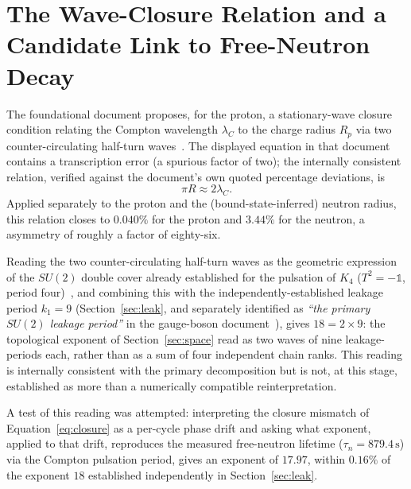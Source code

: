 \documentclass[11pt,a4paper]{article}
\newcommand{\Kfour}{K_4}
\newcommand{\lamC}{\lambda_C}
\begin{document}
\section{The Wave-Closure Relation and a Candidate Link to Free-Neutron Decay}
\label{sec:wave}

The foundational document proposes, for the proton, a stationary-wave closure condition relating the Compton wavelength $\lamC$ to the charge radius $R_p$ via two counter-circulating half-turn waves~\citep{D01}. The displayed equation in that document contains a transcription error (a spurious factor of two); the internally consistent relation, verified against the document's own quoted percentage deviations, is
\begin{equation}
\pi R \approx 2\lamC.
\label{eq:closure}
\end{equation}
Applied separately to the proton and the (bound-state-inferred) neutron radius, this relation closes to $0.040\%$ for the proton and $3.44\%$ for the neutron, a asymmetry of roughly a factor of eighty-six.

\begin{explorbox}
Reading the two counter-circulating half-turn waves as the geometric expression of the $SU(2)$ double cover already established for the pulsation of $\Kfour$ ($T^2=-\mathbb{1}$, period four)~\citep{D33}, and combining this with the independently-established leakage period $k_1=9$ (Section~\ref{sec:leak}, and separately identified as \emph{``the primary $SU(2)$ leakage period''} in the gauge-boson document~\citep{D62}), gives $18=2\times9$: the topological exponent of Section~\ref{sec:space} read as two waves of nine leakage-periods each, rather than as a sum of four independent chain ranks. This reading is internally consistent with the primary decomposition but is not, at this stage, established as more than a numerically compatible reinterpretation.
\end{explorbox}

A test of this reading was attempted: interpreting the closure mismatch of Equation~\eqref{eq:closure} as a per-cycle phase drift and asking what exponent, applied to that drift, reproduces the measured free-neutron lifetime ($\tau_n=879.4\,\mathrm{s}$) via the Compton pulsation period, gives an exponent of $17.97$, within $0.16\%$ of the exponent $18$ established independently in Section~\ref{sec:leak}.
\end{document}
